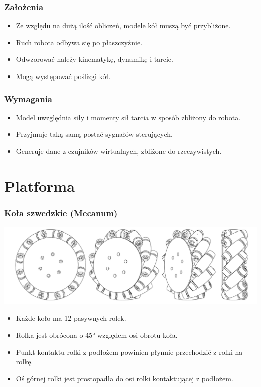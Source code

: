 \documentclass{beamer}
\begin{document}
	\begin{frame}
		\frametitle{Założenia}
		\begin{itemize}
			\item Ze względu na dużą ilość obliczeń, modele kół muszą być przybliżone.
			\item Ruch robota odbywa się po płaszczyźnie.
			\item Odwzorować należy kinematykę, dynamikę i tarcie.
			\item Mogą występować poślizgi kół.
		\end{itemize}
	\end{frame}
	
	\begin{frame}
		\frametitle{Wymagania}
		\begin{itemize}
			\item Model uwzględnia siły i momenty sił tarcia w sposób zbliżony do robota.
			\item Przyjmuje taką samą postać sygnałów sterujących.
			\item Generuje dane z czujników wirtualnych, zbliżone do rzeczywistych.
		\end{itemize}
	\end{frame}
	

	\section{Platforma}
	\begin{frame}
		\frametitle{Koła szwedzkie (Mecanum)}
		\centering
		\includegraphics[width=\textwidth]{graphics/wheel.pdf}
		\begin{itemize}
			\item Każde koło ma 12 pasywnych rolek.
			\item Rolka jest obrócona o 45° względem osi obrotu koła.
			\item Punkt kontaktu rolki z podłożem powinien płynnie przechodzić z rolki na rolkę.
			\item Oś górnej rolki jest prostopadła do osi rolki kontaktującej z podłożem.
		\end{itemize}
	\end{frame}
	
\end{document}
